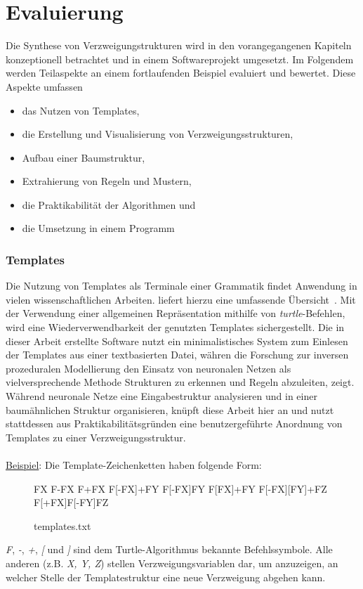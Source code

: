 
\chapter{Evaluierung}
Die Synthese von Verzweigungstrukturen wird in den vorangegangenen Kapiteln konzeptionell betrachtet
und in einem Softwareprojekt umgesetzt.
Im Folgendem werden Teilaspekte an einem fortlaufenden Beispiel evaluiert und bewertet.
Diese Aspekte umfassen
\begin{itemize}
    \item das Nutzen von Templates,
    \item die Erstellung und Visualisierung von Verzweigungsstrukturen,
    \item Aufbau einer Baumstruktur,
    \item Extrahierung von Regeln und Mustern,
    \item die Praktikabilität der Algorithmen und
    \item die Umsetzung in einem Programm
\end{itemize}

\subsection*{Templates}
Die Nutzung von Templates als Terminale einer Grammatik findet Anwendung in vielen wissenschaftlichen Arbeiten.
\citeauthor{aliaga_2016} liefert hierzu eine umfassende Übersicht~\cite{aliaga_2016}.
Mit der Verwendung einer allgemeinen Repräsentation mithilfe von \textit{turtle}-Befehlen, wird eine
Wiederverwendbarkeit der genutzten Templates sichergestellt.
Die in dieser Arbeit erstellte Software nutzt ein minimalistisches System zum Einlesen der Templates aus
einer textbasierten Datei, währen die Forschung zur inversen prozeduralen Modellierung den Einsatz von
neuronalen Netzen als vielversprechende Methode Strukturen zu erkennen und Regeln abzuleiten, zeigt.\\
Während neuronale Netze eine Eingabestruktur analysieren und in einer baumähnlichen Struktur organisieren,
knüpft diese Arbeit hier an und nutzt stattdessen aus Praktikabilitätsgründen eine benutzergeführte Anordnung
von Templates zu einer Verzweigungsstruktur.\\~\\
\underline{Beispiel}: Die Template-Zeichenketten haben folgende Form:
\begin{figure}[H]
    \centering
    \begin{csource}
FX
F-FX
F+FX
F[-FX]+FY
F[-FX]FY
F[FX]+FY
F[-FX][FY]+FZ
F[+FX]F[-FY]FZ
    \end{csource}
    \caption{templates.txt}
\end{figure}
\textit{F}, \textit{-}, \textit{+}, \textit{[} und \textit{]} sind dem Turtle-Algorithmus bekannte
Befehlssymbole.
Alle anderen (z.B. \textit{X, Y, Z}) stellen Verzweigungsvariablen dar, um anzuzeigen, an welcher Stelle
der Templatestruktur eine neue Verzweigung abgehen kann.

